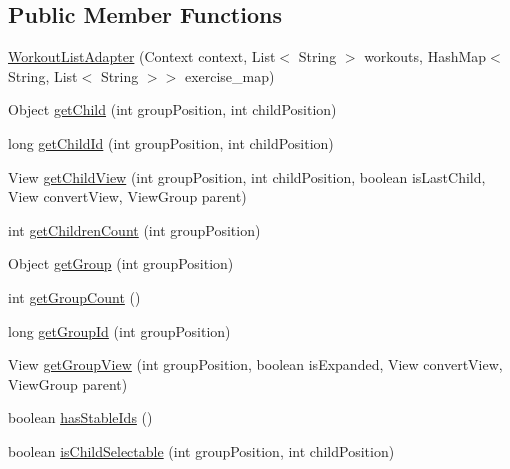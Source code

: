\subsection*{Public Member Functions}
\begin{DoxyCompactItemize}
\item 
\hyperlink{classcom_1_1example_1_1workoutcompanion_1_1_workout_list_adapter_ad91e7d9f7c63697991efdee51f15b6c0}{Workout\-List\-Adapter} (Context context, List$<$ String $>$ workouts, Hash\-Map$<$ String, List$<$ String $>$$>$ exercise\-\_\-map)
\item 
Object \hyperlink{classcom_1_1example_1_1workoutcompanion_1_1_workout_list_adapter_aa7e105889ff5aa26477e607831221b3b}{get\-Child} (int group\-Position, int child\-Position)
\item 
long \hyperlink{classcom_1_1example_1_1workoutcompanion_1_1_workout_list_adapter_ad58f7815eed713fa0b92cbccf6a847ce}{get\-Child\-Id} (int group\-Position, int child\-Position)
\item 
View \hyperlink{classcom_1_1example_1_1workoutcompanion_1_1_workout_list_adapter_a6566a025e560c242b51211e824d2ebb0}{get\-Child\-View} (int group\-Position, int child\-Position, boolean is\-Last\-Child, View convert\-View, View\-Group parent)
\item 
int \hyperlink{classcom_1_1example_1_1workoutcompanion_1_1_workout_list_adapter_a56cd3fbf20f3421cb987bfaba402709d}{get\-Children\-Count} (int group\-Position)
\item 
Object \hyperlink{classcom_1_1example_1_1workoutcompanion_1_1_workout_list_adapter_a56ab1922569a3813563cc3fd19baf729}{get\-Group} (int group\-Position)
\item 
int \hyperlink{classcom_1_1example_1_1workoutcompanion_1_1_workout_list_adapter_a83117605faa7e1a4d5adb2a53987562c}{get\-Group\-Count} ()
\item 
long \hyperlink{classcom_1_1example_1_1workoutcompanion_1_1_workout_list_adapter_a9f3b5c2dcbdb7ff5a68b07e7fc247919}{get\-Group\-Id} (int group\-Position)
\item 
View \hyperlink{classcom_1_1example_1_1workoutcompanion_1_1_workout_list_adapter_a03417bae19e7797eeb89a1c760c4bfb6}{get\-Group\-View} (int group\-Position, boolean is\-Expanded, View convert\-View, View\-Group parent)
\item 
boolean \hyperlink{classcom_1_1example_1_1workoutcompanion_1_1_workout_list_adapter_a62f4af058b24df2a0ab48f5ba775a29f}{has\-Stable\-Ids} ()
\item 
boolean \hyperlink{classcom_1_1example_1_1workoutcompanion_1_1_workout_list_adapter_a143c01361764f521a8fcc9210d486a95}{is\-Child\-Selectable} (int group\-Position, int child\-Position)
\end{DoxyCompactItemize}


